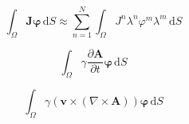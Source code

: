 \begin{equation} \label{eq:24}
\int_{\Omega} \bm{J} \bm{\varphi} \,\mathrm{d}S \approx \sum_{n=1}^{N} \int_{\Omega} J^n \lambda^n \varphi^m \lambda^m \,\mathrm{d}S
\end{equation}



\begin{equation} \label{eq:25}
\int_{\Omega} \gamma \frac{\partial \bm{A}}{\partial t} \bm{\varphi} \,\mathrm{d}S 
\end{equation}

\begin{equation} \label{eq:26}
\int_{\Omega} \gamma \left( \bm{v} \times \left( \nabla \times \bm{A} \right) \right) \bm{\varphi} \,\mathrm{d}S
\end{equation}







